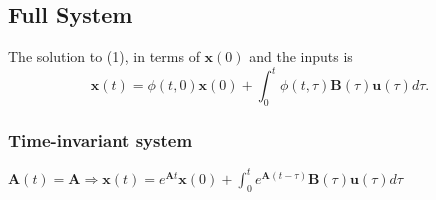 \subsection{Full System}

The solution to (1), in terms of \(\mathbf{x}(0)\) and
the inputs is
\[
    \mathbf{x}(t) = \phi (t,0)\mathbf{x}(0) + \int_{0}^{t}\phi (t,\tau)\mathbf{B}(\tau)\mathbf{u}(\tau)d\tau .
\]

\subsubsection{Time-invariant system} $\mathbf{A}(t) = \mathbf{A} \Longrightarrow \mathbf{x}(t) = e^{\mathbf{A}t}\mathbf{x}(0) + \int_{0}^{t}e^{\mathbf{A}(t - \tau)}\mathbf{B}(\tau)\mathbf{u}(\tau)d\tau$



